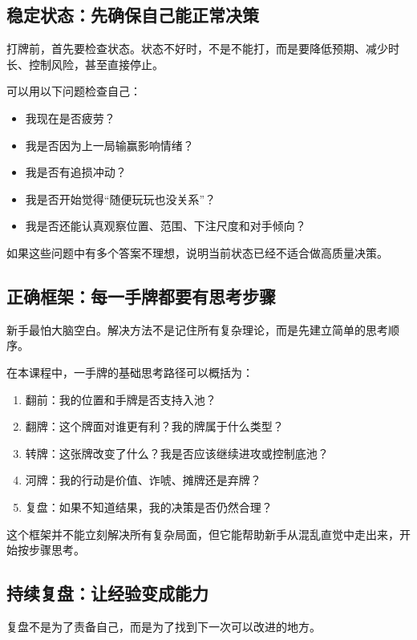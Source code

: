 \subsection{稳定状态：先确保自己能正常决策}

打牌前，首先要检查状态。状态不好时，不是不能打，而是要降低预期、减少时长、控制风险，甚至直接停止。

可以用以下问题检查自己：

\begin{itemize}
\item 我现在是否疲劳？
\item 我是否因为上一局输赢影响情绪？
\item 我是否有追损冲动？
\item 我是否开始觉得“随便玩玩也没关系”？
\item 我是否还能认真观察位置、范围、下注尺度和对手倾向？
\end{itemize}

如果这些问题中有多个答案不理想，说明当前状态已经不适合做高质量决策。

\subsection{正确框架：每一手牌都要有思考步骤}

新手最怕大脑空白。解决方法不是记住所有复杂理论，而是先建立简单的思考顺序。

在本课程中，一手牌的基础思考路径可以概括为：

\begin{enumerate}
\item 翻前：我的位置和手牌是否支持入池？
\item 翻牌：这个牌面对谁更有利？我的牌属于什么类型？
\item 转牌：这张牌改变了什么？我是否应该继续进攻或控制底池？
\item 河牌：我的行动是价值、诈唬、摊牌还是弃牌？
\item 复盘：如果不知道结果，我的决策是否仍然合理？
\end{enumerate}

这个框架并不能立刻解决所有复杂局面，但它能帮助新手从混乱直觉中走出来，开始按步骤思考。

\subsection{持续复盘：让经验变成能力}

复盘不是为了责备自己，而是为了找到下一次可以改进的地方。

